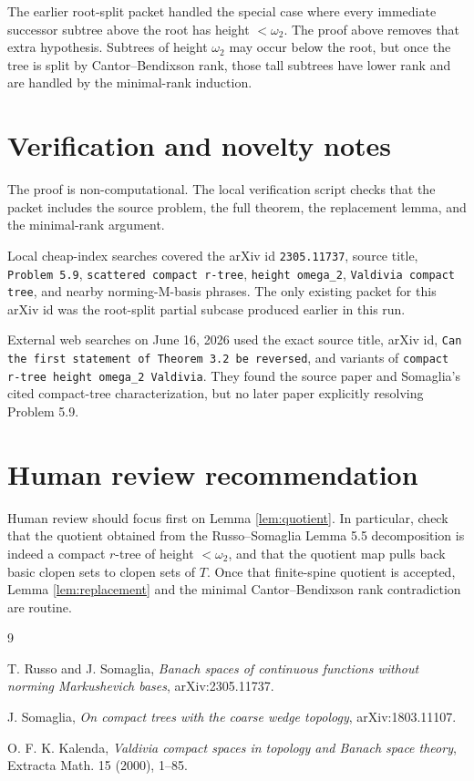 \documentclass[11pt]{article}
\begin{document}
The earlier root-split packet handled the special case where every immediate
successor subtree above the root has height \(<\omega_2\).  The proof above
removes that extra hypothesis.  Subtrees of height \(\omega_2\) may occur
below the root, but once the tree is split by Cantor--Bendixson rank, those
tall subtrees have lower rank and are handled by the minimal-rank induction.

\section*{Verification and novelty notes}

The proof is non-computational.  The local verification script checks that the
packet includes the source problem, the full theorem, the replacement lemma,
and the minimal-rank argument.

Local cheap-index searches covered the arXiv id \texttt{2305.11737}, source
title, \texttt{Problem 5.9}, \texttt{scattered compact r-tree},
\texttt{height omega\_2}, \texttt{Valdivia compact tree}, and nearby
norming-M-basis phrases.  The only existing packet for this arXiv id was the
root-split partial subcase produced earlier in this run.

External web searches on June 16, 2026 used the exact source title, arXiv id,
\texttt{Can the first statement of Theorem 3.2 be reversed}, and variants of
\texttt{compact r-tree height omega\_2 Valdivia}.  They found the source paper
and Somaglia's cited compact-tree characterization, but no later paper
explicitly resolving Problem 5.9.

\section*{Human review recommendation}

Human review should focus first on Lemma \ref{lem:quotient}.  In particular,
check that the quotient obtained from the Russo--Somaglia Lemma 5.5
decomposition is indeed a compact \(r\)-tree of height \(<\omega_2\), and that
the quotient map pulls back basic clopen sets to clopen sets of \(T\).  Once
that finite-spine quotient is accepted, Lemma \ref{lem:replacement} and the
minimal Cantor--Bendixson rank contradiction are routine.

\begin{thebibliography}{9}

T. Russo and J. Somaglia,
\emph{Banach spaces of continuous functions without norming Markushevich
bases},
arXiv:2305.11737.

J. Somaglia,
\emph{On compact trees with the coarse wedge topology},
arXiv:1803.11107.

O. F. K. Kalenda,
\emph{Valdivia compact spaces in topology and Banach space theory},
Extracta Math. 15 (2000), 1--85.

\end{thebibliography}
\end{document}
